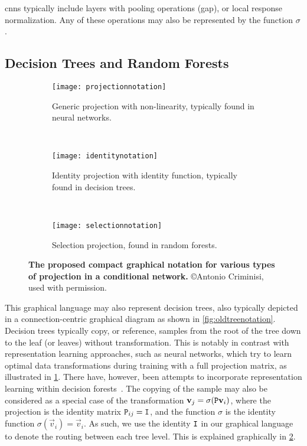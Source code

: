 \documentclass[thesis]{subfiles}
\begin{document}
	\Glspl{cnn} typically include layers with pooling operations (\eg \gls{gap}), or local response normalization. Any of these operations may also be represented by the function $\sigma$.
	
	\subsection{Decision Trees and Random Forests}
	
	\begin{figure}[tbp] 
		\centering
		\begin{subfigure}[b]{\textwidth}
			\centering
			\texttt{[image: projectionnotation]}
			\caption{Generic projection with non-linearity, typically found in neural networks.}\label{fig:projectionnotation}
		\end{subfigure}
		~
		\begin{subfigure}[b]{\textwidth}
			\centering
			\texttt{[image: identitynotation]}
			\caption{Identity projection with identity function, typically found in decision trees.}\label{fig:identitynotation}
		\end{subfigure}
		~
		\begin{subfigure}[b]{\textwidth}
			\centering
			\texttt{[image: selectionnotation]}
			\caption{Selection projection, found in random forests.}\label{fig:selectionnotation}
		\end{subfigure}
		\caption[Various projection matrices in conditional networks]{\textbf{The proposed compact graphical notation for various types of projection in a conditional network.} \copyright Antonio Criminisi, used with permission.}\label{fig:projections}
	\end{figure}
	
	This graphical language may also represent decision trees, also typically depicted in a connection-centric graphical diagram as shown in \cref{fig:oldtreenotation}. Decision trees typically copy, or reference, samples from the root of the tree down to the leaf (or leaves) without transformation. This is notably in contrast with representation learning approaches, such as neural networks, which try to learn optimal data transformations during training with a full projection matrix, as illustrated in \cref{fig:projectionnotation}. There have, however, been attempts to incorporate representation learning within decision forests~\citep{montillo2011entangled,BuloKontsch2014}. The copying of the sample may also be considered as a special case of the transformation $\vec v_j = \sigma(\mat P \vec v_i)$, where the projection is the identity matrix $\mat P_{ij} = \mat I$, and the function $\sigma$ is the identity function $\sigma(\vec v_i) = \vec v_i$. As such, we use the identity $\mat I$ in our graphical language to denote the routing between each tree level. This is explained graphically in \cref{fig:identitynotation}.
	
\end{document}
